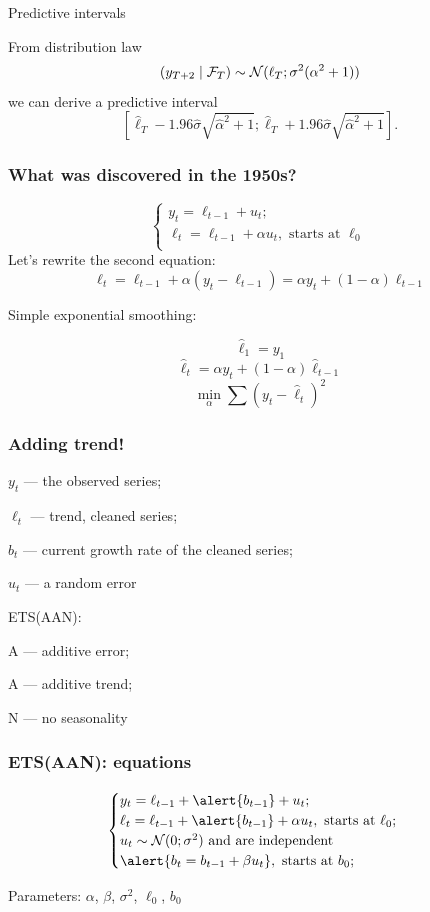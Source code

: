 \begin{frame}{Predictive intervals}
	
	From distribution law
	\[
	(y_{T+2} \mid \mathcal F_T) \sim \mathcal{N}(\ell_T; \sigma^2(\alpha^2 + 1))
	\]
	we can derive a \pause \alert{predictive interval}
	\[
	[\hat\ell_T - 1.96 \hat\sigma \sqrt{\hat\alpha^2 + 1}; \hat \ell_T + 1.96 \hat\sigma \sqrt{\hat\alpha^2 + 1}].
	\]
\end{frame}


\begin{frame}
	\frametitle{What was discovered in the 1950s?}
	
	\[
	\begin{cases}
		y_t = \ell_{t-1} + u_t;\\
		\ell_t = \ell_{t-1} + \alpha u_t, \text{ starts at } \ell_0 \\
	\end{cases}
	\]
	\pause
	Let's rewrite the second equation:
	\[
	\ell_t = \ell_{t-1} + \alpha (y_t - \ell_{t-1}) = \alpha y_t + (1 - \alpha) \ell_{t-1}
	\]
	
	\pause
	\alert{Simple exponential smoothing}:
	
	\[
	\hat\ell_1 = y_1
	\]
	\pause
	\[
	\hat \ell_t = \alpha y_t + (1-\alpha) \hat \ell_{t-1}
	\]
	\pause
	\[
	\min_{\alpha} \sum (y_t - \hat \ell_t)^2
	\]
	
\end{frame}







\begin{frame}
	\frametitle{Adding trend!}
	
	$y_t$ — the observed series;
	
	$\ell_t$ — trend, cleaned series;
	
	$b_t$ — current growth rate of the cleaned series;
	
	$u_t$ — a random error
	
	\pause
	ETS(AAN):
	
	A — \alert{additive} error;
	
	A — \alert{additive} trend;
	
	N — \alert{no} seasonality
	
\end{frame}

\begin{frame}
	\frametitle{ETS(AAN): equations}
	
	
	\[
	\begin{cases}
		y_t = \ell_{t-1} + \alert{b_{t-1}} + u_t; \\
		\ell_t = \ell_{t-1} + \alert{b_{t-1}} + \alpha u_t, \text{ starts at } \ell_0; \\
		u_t \sim \dN(0;\sigma^2) \text{ and are independent} \\
		\alert{b_t = b_{t-1} + \beta u_t},\text{ starts at } b_0; \\
	\end{cases}
	\]
	
	
	Parameters: $\alpha$, $\beta$, $\sigma^2$, $\ell_0$, $b_0$
	
	
\end{frame}

